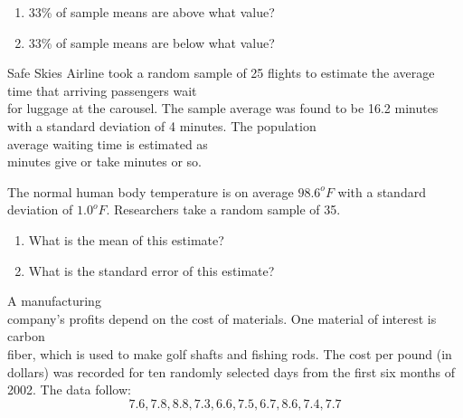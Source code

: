 \documentclass[11pt, chapterprefix=true]{scrbook}\usepackage[]{graphicx}\usepackage[]{color}
\begin{document}
\begin{exercises}
\begin{solution}
\begin{enumerate}
  

  \item 33\% of sample means are above what value? 
  \item 33\% of sample means are below what value?
\end{enumerate}
\end{solution}

\begin{exercise}  %

Safe Skies Airline took a random sample of 25 flights to estimate the average time that arriving passengers wait \\ for luggage at the carousel.  The sample average was found to be 16.2 minutes with a standard deviation of 4 minutes.  The population \\ average waiting time is estimated as \\ \underline{\phantom{xxxxxxxx}} minutes give or take  \underline{\phantom{xxxxxxxx}} minutes or  so.

\end{exercise}
\begin{solution}  %

\end{solution}

\begin{exercise}  %

The normal human body temperature is on average $98.6^o F$ with a standard deviation of $1.0^o F$. Researchers take a random sample of 35. 

\begin{enumerate}
\item What is the mean of this estimate? 
\item What is the standard error of this estimate?
\end{enumerate}

\end{exercise}
\begin{solution}  %

\end{solution}

\begin{exercise}  %

A manufacturing \\ company's profits depend on the cost of materials.  One material of interest is carbon \\ fiber, which is used to make golf shafts and fishing rods.  The cost per pound (in dollars) was recorded for ten randomly selected days from the first six months of 2002. The data follow:
            $$7.6, 7.8, 8.8, 7.3, 6.6, 7.5, 6.7, 8.6, 7.4, 7.7$$
            

\end{exercise}
\end{exercises}
\end{document}
